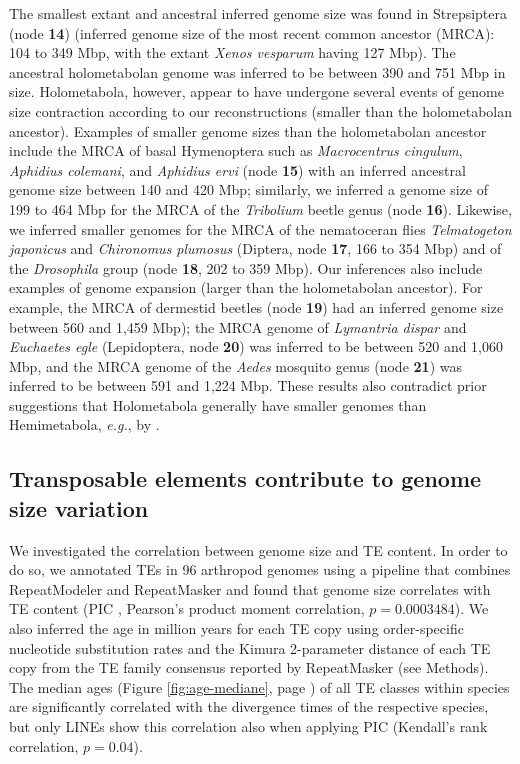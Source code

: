 The smallest extant and ancestral inferred genome size was found in
Strepsiptera (node \textbf{14}) (inferred genome size of the most recent
common ancestor (MRCA): 104 to 349 Mbp, with the extant \emph{Xenos
vesparum} having 127 Mbp). The ancestral holometabolan genome was
inferred to be between 390 and 751 Mbp in size. Holometabola, however,
appear to have undergone several events of genome size contraction
according to our reconstructions (smaller than the holometabolan
ancestor). Examples of smaller genome sizes than the holometabolan
ancestor include the MRCA of basal Hymenoptera such as
\emph{Macrocentrus cingulum}, \emph{Aphidius colemani}, and
\emph{Aphidius ervi} (node \textbf{15}) with an inferred ancestral
genome size between 140 and 420 Mbp; similarly, we inferred a genome
size of 199 to 464 Mbp for the MRCA of the \emph{Tribolium} beetle genus
(node \textbf{16}). Likewise, we inferred smaller genomes for the MRCA
of the nematoceran flies \emph{Telmatogeton japonicus} and
\emph{Chironomus plumosus} (Diptera, node \textbf{17}, 166 to 354 Mbp)
and of the \emph{Drosophila} group (node \textbf{18}, 202 to 359 Mbp).
Our inferences also include examples of genome expansion (larger than
the holometabolan ancestor). For example, the MRCA of dermestid beetles
(node \textbf{19}) had an inferred genome size between 560 and 1,459
Mbp); the MRCA genome of \emph{Lymantria dispar} and \emph{Euchaetes
egle} (Lepidoptera, node \textbf{20}) was inferred to be between 520 and
1,060 Mbp, and the MRCA genome of the \emph{Aedes} mosquito genus (node
\textbf{21}) was inferred to be between 591 and 1,224 Mbp. These results
also contradict prior suggestions that Holometabola generally have
smaller genomes than Hemimetabola, \emph{e.g.}, by \citet{Hanrahan2011}.

\subsection*{Transposable elements contribute to genome size
variation}

We investigated the correlation between genome size and TE content. In
order to do so, we annotated TEs in 96 arthropod genomes using a
pipeline that combines RepeatModeler \citep{Smit2015a} and RepeatMasker
\citep{Smit2015} and found that genome size correlates with TE content
(PIC \citep{Felsenstein1985}, Pearson's product moment correlation,
\(p = 0.0003484\)). We also inferred the age in million years for each
TE copy using order-specific nucleotide substitution rates and the
Kimura 2-parameter distance of each TE copy from the TE family consensus
reported by RepeatMasker (see Methods). The median ages (Figure
\ref{fig:age-mediane}, page \pageref{fig:age-mediane}) of all TE classes within species are
significantly correlated with the divergence times of the respective
species, but only LINEs show this correlation also when applying PIC
(Kendall's rank correlation, \(p = 0.04\)).

